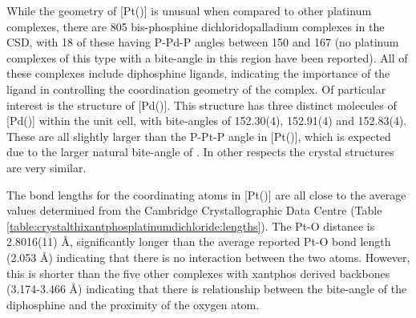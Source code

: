 While the geometry of [Pt(\tButhixantphos)] is unusual when compared to other platinum complexes, there are 805 bis-phosphine dichloridopalladium complexes in the \gls{CSD}, with 18 of these having P-Pd-P angles between 150 and 167\degrees{} (no platinum complexes of this type with a bite-angle in this region have been reported).\cite{Allen2002}  All of these complexes include diphosphine ligands, indicating the importance of the ligand in controlling the coordination geometry of the complex.  Of particular interest is the structure of [Pd(\tBuxantphos)].\cite{Allen2002}  This structure has three distinct molecules of [Pd(\tBuxantphos)] within the unit cell, with bite-angles of 152.30(4), 152.91(4) and 152.83(4)\degrees.  These are all slightly larger than the P-Pt-P angle in [Pt(\tButhixantphos)], which is expected due to the larger natural bite-angle of \tBuxantphos{}.  In other respects the crystal structures are very similar.  

The bond lengths for the coordinating atoms in [Pt(\tButhixantphos)] are all close to the average values determined from the Cambridge Crystallographic Data Centre (Table \ref{table:crystalthixantphosplatinumdichloride:lengths}).  The Pt-O distance is 2.8016(11) \si{\angstrom}, significantly longer than the average reported Pt-O bond length (2.053 \si{\angstrom}) indicating that there is no interaction between the two atoms.  However, this is shorter than the five other complexes with xantphos derived backbones (3.174-3.466 \si{\angstrom}) indicating that there is relationship between the bite-angle of the diphosphine and the proximity of the oxygen atom.  

